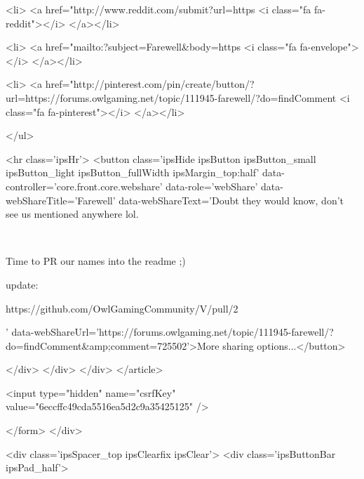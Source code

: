 			<li>
<a href="http://www.reddit.com/submit?url=https%
	<i class="fa fa-reddit"></i>
</a></li>
		
			<li>
<a href="mailto:?subject=Farewell&body=https%
	<i class="fa fa-envelope"></i>
</a></li>
		
			<li>
<a href="http://pinterest.com/pin/create/button/?url=https://forums.owlgaming.net/topic/111945-farewell/?do=findComment%
	<i class="fa fa-pinterest"></i>
</a></li>
		
	</ul>


	<hr class='ipsHr'>
	<button class='ipsHide ipsButton ipsButton_small ipsButton_light ipsButton_fullWidth ipsMargin_top:half' data-controller='core.front.core.webshare' data-role='webShare' data-webShareTitle='Farewell' data-webShareText='Doubt they would know, don’t see us mentioned anywhere lol.
 


	 
 


	Time to PR our names into the readme ;)
 


	update:
 


	https://github.com/OwlGamingCommunity/V/pull/2
 
' data-webShareUrl='https://forums.owlgaming.net/topic/111945-farewell/?do=findComment&amp;comment=725502'>More sharing options...</button>

	
</div>
</div>
	</div>
</article>
					
				
			
			
<input type="hidden" name="csrfKey" value="6eccffc49cda5516ea5d2c9a35425125" />


		</form>
	</div>

	
	
		<div class='ipsSpacer_top ipsClearfix ipsClear'>
			<div class='ipsButtonBar ipsPad_half'>


